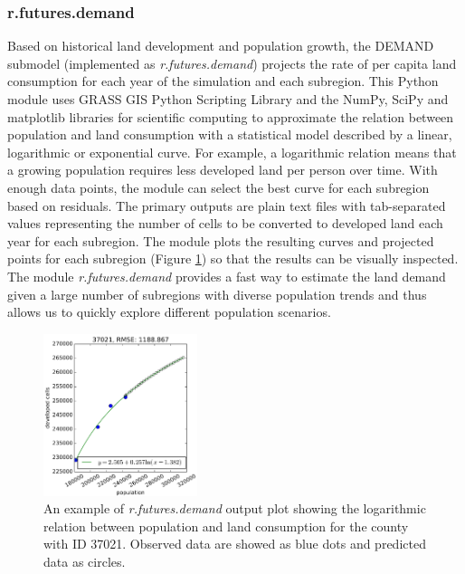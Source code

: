 \documentclass{isprs}
\begin{document}
\subsubsection{r.futures.demand}
Based on historical land development and population growth, the DEMAND submodel 
(implemented as \emph{r.futures.demand})
projects the rate of per capita land consumption for each year of the simulation
and each subregion. This Python module uses GRASS GIS Python Scripting Library 
and the NumPy, SciPy and matplotlib 
libraries for scientific computing
to approximate the relation between population and land consumption
with a statistical model described by a linear, logarithmic or exponential curve.
For example, a logarithmic relation means that a growing population requires
less developed land per person over time.
With enough data points, the module
can select the best curve for each subregion based on residuals.
The primary outputs are plain text files with tab-separated values
representing the number of cells to be converted to developed land each year for each subregion.
The module
plots the resulting curves and projected points for each subregion (Figure \ref{fig:demand}) 
so that the results can be visually inspected.
The module \emph{r.futures.demand} provides a fast way to estimate
the land demand given a large number of subregions with diverse population
trends and thus allows us to quickly explore different population scenarios.

\begin{figure}[h!]
 \centering
 \includegraphics[width=0.4\textwidth]{./figures/plot_demand.pdf}
 \caption{An example of \emph{r.futures.demand} output plot showing
 the logarithmic relation between population and land consumption
 for the county with ID 37021.
 Observed data are showed as blue dots and predicted data as circles.
 }
 \label{fig:demand}
\end{figure}
\end{document}
